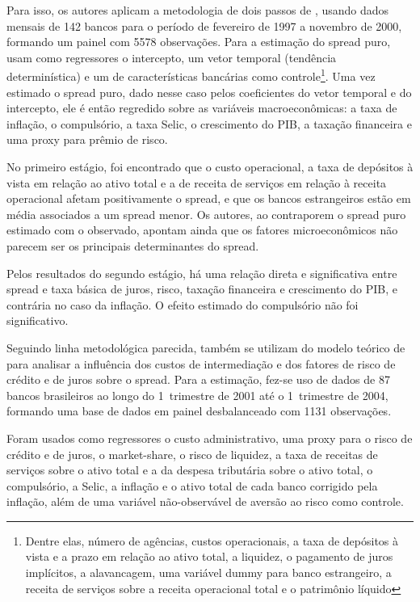 \documentclass[a4paper,
               article,
               12pt,
               openany,
               oneside,
               english,
               brazil]{abntex2}
\numberwithin{equation}{section}
\begin{document}
    Para isso, os autores aplicam a metodologia de dois passos de \textcite{hoesaunders}, usando dados mensais de 142 bancos para o período de fevereiro de 1997 a novembro de 2000, formando um painel com 5578 observações. Para a estimação do spread puro, usam como regressores o intercepto, um vetor temporal (tendência determinística) e um de características bancárias como controle\footnote{Dentre elas, número de agências, custos operacionais, a taxa de depósitos à vista e a prazo em relação ao ativo total, a liquidez, o pagamento de juros implícitos, a alavancagem, uma variável dummy para banco estrangeiro, a receita de serviços sobre a receita operacional total e o patrimônio líquido}. Uma vez estimado o spread puro, dado nesse caso pelos coeficientes do vetor temporal e do intercepto, ele é então regredido sobre as variáveis macroeconômicas: a taxa de inflação, o compulsório, a taxa Selic, o crescimento do PIB, a taxação financeira e uma proxy para prêmio de risco.

    No primeiro estágio, foi encontrado que o custo operacional, a taxa de depósitos à vista em relação ao ativo total e a de receita de serviços em relação à receita operacional afetam positivamente o spread, e que os bancos estrangeiros estão em média associados a um spread menor. Os autores, ao contraporem o spread puro estimado com o observado, apontam ainda que os fatores microeconômicos não parecem ser os principais determinantes do spread.
    
    Pelos resultados do segundo estágio, há uma relação direta e significativa entre spread e taxa básica de juros, risco, taxação financeira e crescimento do PIB, e contrária no caso da inflação. O efeito estimado do compulsório não foi significativo.

    Seguindo linha metodológica parecida, \textcite{bignotto06} também se utilizam do modelo teórico de \textcite{hoesaunders} para analisar a influência dos custos de intermediação e dos fatores de risco de crédito e de juros sobre o spread. Para a estimação, fez-se uso de dados de 87 bancos brasileiros ao longo do 1\degrees\ trimestre de 2001 até o 1\degrees\ trimestre de 2004, formando uma base de dados em painel desbalanceado com 1131 observações.
    
    Foram usados como regressores o custo administrativo, uma proxy para o risco de crédito e de juros, o market-share, o risco de liquidez, a taxa de receitas de serviços sobre o ativo total e a da despesa tributária sobre o ativo total, o compulsório, a Selic, a inflação e o ativo total de cada banco corrigido pela inflação, além de uma variável não-observável de aversão ao risco como controle. 
    
\end{document}
